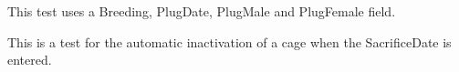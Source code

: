 \documentclass[letterpaper,10pt,english]{sphinxmanual}
\begin{document}
\begin{fulllineitems}
\begin{fulllineitems}
This test uses a Breeding, PlugDate, PlugMale and PlugFemale field.

\end{fulllineitems}


\begin{fulllineitems}
\label{api:mousedb.timed_mating.tests.Timed_MatingModelTests.test_set_plugevent_inactive}
This is a test for the automatic inactivation of a cage when the SacrificeDate is entered.

\end{fulllineitems}


\end{fulllineitems}

\end{document}
